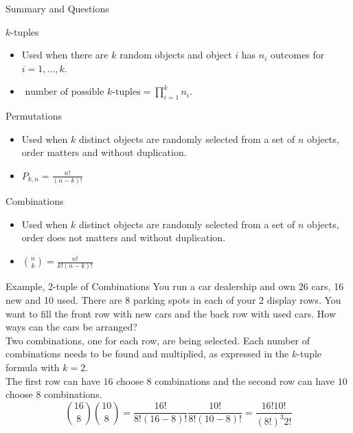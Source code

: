 \documentclass[]{beamer}
\newcommand{\nl}[1]{\vspace{#1 em}}
\begin{document}
\begin{frame}{Summary and Questions}
    \begin{block}{$k$-tuples}
        \begin{itemize}
            \item Used when there are $k$ random objects and object $i$ has $n_i$ outcomes for $i=1,\ldots, k$.
            \item $\text{ number of possible } k\text{-tuples} = \prod_{i=1}^k n_i$.
        \end{itemize}
    \end{block}
    \begin{block}{Permutations}
        \begin{itemize}
            \item Used when $k$ distinct objects are randomly selected from a set of $n$ objects, order matters and without duplication.
            \item $P_{k,n} = \frac{n!}{(n-k)!}$
        \end{itemize}
    \end{block}
    \begin{block}{Combinations}
        \begin{itemize}
            \item Used when $k$ distinct objects are randomly selected from a set of $n$ objects, order does not matters and without duplication.
            \item $\binom{n}{k} = \frac{n!}{k!(n-k)!}$
        \end{itemize}
    \end{block}
\end{frame}

\begin{frame}{Example, 2-tuple of Combinations}
    You run a car dealership and own 26 cars, 16 new and 10 used. There are 8 parking spots in each of your 2 display rows. You want to fill the front row with new cars and the back row with used cars. How ways can the cars be arranged?\\
    \nl{0.5}
    \pause Two combinations, one for each row, are being selected. Each number of combinations needs to be found and multiplied, as expressed in the $k$-tuple formula with $k=2$.\\
    \pause The first row can have $16$ choose $8$ combinations and the second row can have $10$ choose $8$ combinations.
    \[\binom{16}{8}\binom{10}{8} = \frac{16!}{8!(16-8)!} \frac{10!}{8!(10-8)!} = \frac{16! 10!}{(8!)^3 2!}\]
\end{frame}
\end{document}
